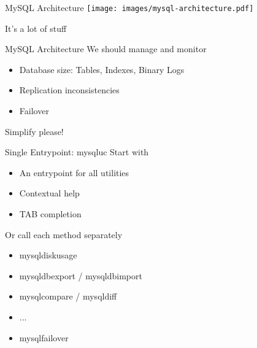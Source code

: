 \documentclass{beamer}[10]
\begin{document}
\begin{pyframe}{MySQL Architecture}
\texttt{[image: images/mysql-architecture.pdf]}
{\large
    \begin{center}
    It's a lot of stuff
    \end{center}
}
\end{pyframe}


\begin{pyframe}{MySQL Architecture}
We should manage and monitor
\begin{itemize}
\item Database size: Tables, Indexes, Binary Logs
\item Replication inconsistencies
\item Failover
\end{itemize}
Simplify please!
\end{pyframe}

\begin{pyframe}{Single Entrypoint: mysqluc}
Start with 
\begin{itemize}
\item An entrypoint for all utilities
\item Contextual help
\item TAB completion
\end{itemize}
Or call each method separately
\begin{itemize}
\item mysqldiskusage
\item mysqldbexport / mysqldbimport
\item mysqlcompare / mysqldiff
\item ...
\item mysqlfailover
\end{itemize}
\end{pyframe}
\end{document}
